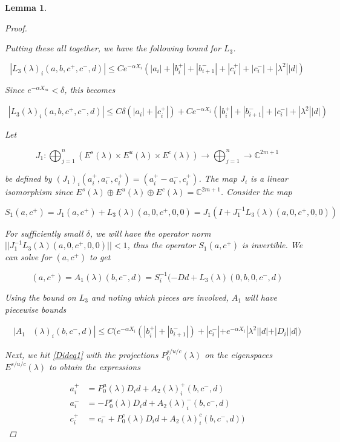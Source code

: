 \documentclass[12pt]{article}
\def\C{{\mathbb C}}
\newtheorem{lemma}{Lemma}
\begin{document}
\begin{lemma}
\begin{proof}
\begin{enumerate}
\end{enumerate}

Putting these all together, we have the following bound for $L_3$.

\begin{equation}\label{L3bound}
|L_3(\lambda)_i(a, b, c^+, c^-, d)| \leq C e^{-\alpha X_i} \left( |a_i| + |b_i^+| + |b_{i+1}^-| + |c_i^+| + |c_i^-| + |\lambda^2| |d| \right)
\end{equation}

Since $e^{-\alpha X_m} < \delta$, this becomes

\begin{align*}
|L_3(\lambda)_i(a, b, c^+, c^-, d)| \leq C \delta ( |a_i| + |c_i^+| ) + C e^{-\alpha X_i} \left( |b_i^+| + |b_{i+1}^-| + |c_i^-| + |\lambda^2| |d| \right)
\end{align*}

Let 

\[
J_1: \bigoplus_{j=1}^n (E^s(\lambda) \times E^u(
\lambda) \times E^c(\lambda) ) \rightarrow \bigoplus_{j=1}^n \rightarrow \C^{2m+1}
\]

be defined by $(J_1)_i(a_i^+, a_i^-, c_i^+) = (a_i^+ - a_i^-, c_i^+)$. The map $J_i$ is a linear isomorphism since $E^s(\lambda) \oplus E^u(\lambda) \oplus E^c(\lambda) = \C^{2m + 1}$. Consider the map

\[
S_1(a, c^+) = J_1 (a, c^+) + L_3(\lambda)(a, 0, c^+, 0, 0) = J_1( I + J_1^{-1} L_3(\lambda)(a, 0, c^+, 0, 0))
\]

For sufficiently small $\delta$, we will have the operator norm $||J_1^{-1} L_3(\lambda)(a, 0, c^+, 0, 0)|| < 1$, thus the operator $S_1(a, c^+)$ is invertible. We can solve for $(a, c^+)$ to get

\[
(a, c^+) = A_1(\lambda)(b, c^-, d) = S_i^{-1}(-D d + L_3(\lambda)(0, b, 0, c^-, d)
\]

Using the bound on $L_3$ and noting which pieces are involved, $A_1$ will have piecewise bounds

\begin{align*}
|A_1&(\lambda)_i(b, c^-, d)|
\leq C \Big( e^{-\alpha X_i} (|b_i^+| + |b_{i+1}^-|) + |c_i^-| + e^{-\alpha X_i} |\lambda^2||d| + |D_i||d| \Big)
\end{align*} 

Next, we hit \eqref{Dideq1} with the projections $P_0^{s/u/c}(\lambda)$ on the eigenspaces $E^{s/u/c}(\lambda)$ to obtain the expressions

\begin{align*}
a_i^+ &= P_0^u(\lambda) D_i d + A_2(\lambda)_i^+(b, c^-, d) \\
a_i^- &= -P_0^s(\lambda) D_i d + A_2(\lambda)_i^-(b, c^-, d) \\
c_i^+ &= c_i^- + P_0^c(\lambda) D_i d + A_2(\lambda)_i^c(b, c^-, d) )
\end{align*}


\end{proof}
\end{lemma}
\end{document}
